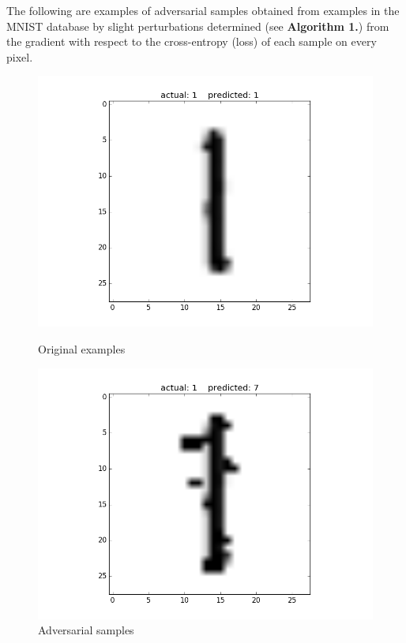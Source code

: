 \documentclass{article}
\begin{document}
The following are examples of adversarial samples obtained from examples in the MNIST database by slight perturbations determined (see \textbf{Algorithm 1.}) from the gradient with respect to the cross-entropy (loss) of each sample on every pixel. 
\begin{figure}[h!]
	\begin{minipage}{0.5\textwidth}
		\centering
		\includegraphics[width=\textwidth]{sample_original1.png}
		\caption{Original examples}
	\end{minipage} \hfill
	\begin{minipage}{0.5\textwidth}
		\centering
		\includegraphics[width=\textwidth]{sample_perturbed1.png}
		\caption{Adversarial samples}
	\end{minipage} 
\end{figure}
\end{document}
